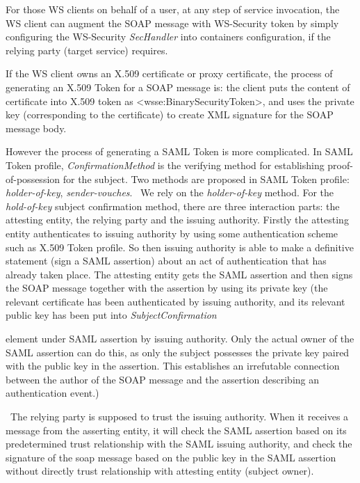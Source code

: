 \documentclass{article}
\begin{document}
For those WS clients on behalf of a user, at any step of service
invocation, the WS client can augment the SOAP message with WS-Security
token by simply configuring the WS-Security \textit{SecHandler} into
container{\textquotesingle}s configuration, if the relying party
(target service) requires. 

If the WS client owns an X.509 certificate or proxy certificate, the
process of generating an X.509 Token for a SOAP message is: the client
puts the content of certificate into X.509 token as
{\textless}wsse:BinarySecurityToken{\textgreater}, and uses the private
key (corresponding to the certificate) to create XML signature for the
SOAP message body. 

However the process of generating a SAML Token is more complicated. In
SAML Token profile, \textit{ConfirmationMethod} is the verifying method
for establishing proof-of-possession for the subject. Two methods are
proposed in SAML Token profile: \textit{holder-of-key},
\textit{sender-vouches}. \ We rely on the \textit{holder-of-key
}method. For the \textit{hold-of-key} subject confirmation method,
there are three interaction parts: the attesting entity, the relying
party and the issuing authority. Firstly the attesting entity
authenticates to issuing authority by using some authentication scheme
such as X.509 Token profile. So then issuing authority is able to make
a definitive statement (sign a SAML assertion) about an act of
authentication that has already taken place. The attesting entity gets
the SAML assertion and then signs the SOAP message together with the
assertion by using its private key (the relevant certificate has been
authenticated by issuing authority, and its relevant public key has
been put into \textit{SubjectConfirmation}

element under SAML assertion by issuing authority. Only the actual owner
of the SAML assertion can do this, as only the subject possesses the
private key paired with the public key in the assertion. This
establishes an irrefutable connection between the author of the SOAP
message and the assertion describing an authentication event.)

\ The relying party is supposed to trust the issuing authority. When it
receives a message from the asserting entity, it will check the SAML
assertion based on its predetermined trust relationship with the SAML
issuing authority, and check the signature of the soap message based on
the public key in the SAML assertion without directly trust
relationship with attesting entity (subject owner).
\end{document}
